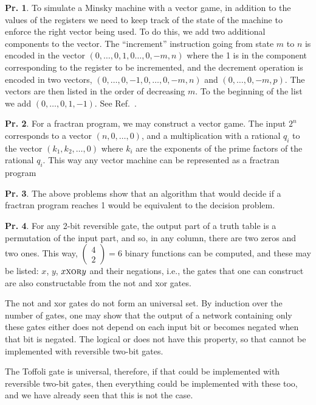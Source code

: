 \documentclass[a4paper,12pt]{article}
\theoremstyle{definition}
\newtheorem{problem}{Pr.}[section]
\begin{document}
\begin{problem}
 To simulate a Minsky machine with a vector game, in addition to the values of the registers we need to keep track of the state of the machine to enforce the right vector being used. To do this, we add two additional components to the vector. The ``increment'' instruction going from state $m$ to $n$ is encoded in the vector $(0,\dots, 0,1,0\dots,0,-m, n)$ where the 1 is in the component corresponding to the register to be incremented, and the decrement operation is encoded in two vectors, $(0,\dots,0,-1,0,\dots,0,-m, n)$ and $(0,\dots,0,-m,p)$. The vectors are then listed in the order of decreasing $m$. To the beginning of the list we add $(0,\dots,0,1,-1)$. See Ref.~\cite{conway, downey}.
\end{problem}

\begin{problem}
 For a {\sc fractran} program, we may construct a vector game. The input $2^n$ corresponds to a vector $(n, 0, \dots, 0)$, and a multiplication with a rational $q_i$ to the vector $(k_1, k_2, \dots, 0)$ where $k_i$ are the exponents of the prime factors of the rational $q_i$. This way any vector machine can be represented as a {\sc fractran} program \cite{conway}
\end{problem}

\begin{problem}
 The above problems show that an algorithm that would decide if a {\sc fractran} program reaches 1 would be equivalent to the decision problem.
\end{problem}

\begin{problem}
 For any 2-bit reversible gate, the output part of a truth table is a permutation of the input part, and so, in any column, there are two zeros and two ones. This way, $\begin{pmatrix} 4 \\ 2 \end{pmatrix} = 6$ binary functions can be computed, and these may be listed: $x$, $y$, $x \text{\sc xor} y$ and their negations, i.e., the gates that one can construct are also constructable from the {\sc not} and {\sc xor} gates.
 
 The {\sc not} and {\sc xor} gates do not form an universal set. By induction over the number of gates, one may show that the output of a network containing only these gates either does not depend on each input bit or becomes negated when that bit is negated. The logical or does not have this property, so that cannot be implemented with reversible two-bit gates.
 
 The Toffoli gate is universal, therefore, if that could be implemented with reversible two-bit gates, then everything could be implemented with these too, and we have already seen that this is not the case.
\end{problem}
\end{document}
